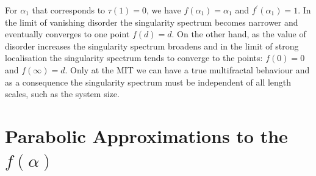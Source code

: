 For $\alpha_1$ that corresponds to $\tau(1)=0$, we have $f(\alpha_1)=\alpha_1$ and $f^\prime (\alpha_1)=1$. 
In the limit of vanishing disorder the singularity spectrum becomes narrower and
eventually converges to one point $f(d)=d$. On the other hand, as the value of
disorder increases the singularity spectrum broadens and
in the limit of strong localisation the singularity spectrum tends to converge
to the points:  $f(0)=0$ and $f(\infty)=d$.
Only at the MIT we can have a true multifractal behaviour and as a consequence
the singularity spectrum must be independent of all length scales, such as
the system size.

\section{Parabolic Approximations to the $f(\alpha)$}
\label{sec-parabola}

